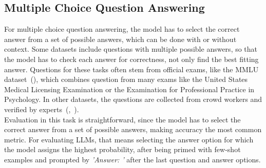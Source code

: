 \subsection{Multiple Choice Question Answering}\label{sec:multiple-choice-qa}
For multiple choice question answering, the model has to select the correct answer from a set of possible answers, which can be done with or without context.
Some datasets include questions with multiple possible answers, so that the model has to check each answer for correctness, not only find the best fitting answer.
Questions for these tasks often stem from official exams, like the MMLU dataset~(\cite{hendrycks:2020}), which combines question from many exams like the United States Medical Licensing Examination or the Examination for Professional Practice in Psychology.
In other datasets, the questions are collected from crowd workers and verified by experts~(\cite{clark:2018},~\cite{mihaylov:2018}).
\\
Evaluation in this task is straightforward, since the model has to select the correct answer from a set of possible answers, making accuracy the most common metric.
For evaluating LLMs, that means selecting the answer option for which the model assigns the highest probability, after being primed with few-shot examples and prompted by \emph{'Answer: '} after the last question and answer options.

